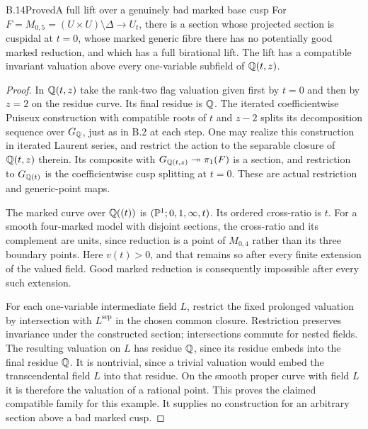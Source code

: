 \begin{statement}{B.14}{Proved}{A full lift over a genuinely bad marked base cusp}
For $F=M_{0,5}=(U\times U)\setminus\Delta\to U_t$, there is a
section whose projected section is cuspidal at $t=0$, whose marked
generic fibre there has no potentially good marked reduction,
and which has a full birational lift.  The lift has a compatible
invariant valuation above every one-variable subfield of $\mathbb Q(t,z)$.
\end{statement}
\begin{proof}
In $\mathbb Q(t,z)$ take the rank-two flag valuation given first by $t=0$
and then by $z=2$ on the residue curve.  Its final residue is $\mathbb Q$.
The iterated coefficientwise Puiseux construction with compatible
roots of $t$ and $z-2$ splits its decomposition sequence over
$G_\mathbb Q$, just as in B.2 at each step.  One may realize this
construction in iterated Laurent series, and restrict the action
to the separable closure of $\mathbb Q(t,z)$ therein.  Its composite with
$G_{\mathbb Q(t,z)}\twoheadrightarrow\pi_1(F)$ is a section, and
restriction to $G_{\mathbb Q(t)}$ is the coefficientwise cusp splitting
at $t=0$.  These are actual restriction and generic-point maps.

The marked curve over $\mathbb Q((t))$ is
$(\mathbb P^1;0,1,\infty,t)$.  Its ordered cross-ratio is $t$.
For a smooth four-marked model with disjoint sections, the
cross-ratio and its complement are units, since reduction is a
point of $M_{0,4}$ rather than its three boundary points.
Here $v(t)>0$, and that remains so after every finite extension
of the valued field.  Good marked reduction is consequently
impossible after every such extension.

For each one-variable intermediate field $L$, restrict the fixed
prolonged valuation by intersection with $L^{\mathrm{sep}}$ in
the chosen common closure.  Restriction preserves invariance under
the constructed section; intersections commute for nested fields.
The resulting valuation on $L$ has residue $\mathbb Q$, since its residue
embeds into the final residue $\mathbb Q$.  It is nontrivial, since a
trivial valuation would embed the transcendental field $L$ into
that residue.  On the smooth proper curve with field $L$ it is
therefore the valuation of a rational point.  This proves the
claimed compatible family for this example.  It supplies no
construction for an arbitrary section above a bad marked cusp.
\end{proof}

